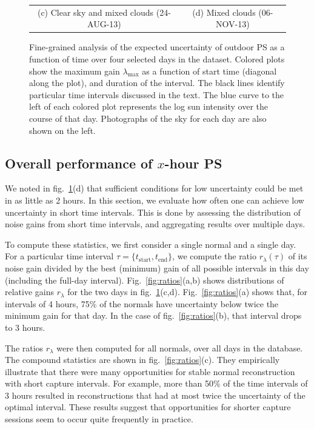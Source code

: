 \begin{figure}[!th]
\begin{tabular}{cc}
(c) Clear sky and mixed clouds (24-AUG-13) & (d) Mixed clouds (06-NOV-13)
\end{tabular}
\vspace{.25em}
\caption{Fine-grained analysis of the expected uncertainty of outdoor PS as a function of time over four selected days in the dataset. Colored plots show the maximum gain $\lambda_\text{max}$ as a function of start time (diagonal along the plot), and duration of the interval. The black lines identify particular time intervals discussed in the text. The blue curve to the left of each colored plot represents the log sun intensity over the course of that day. Photographs of the sky for each day are also shown on the left.}
\label{fig:events}
\end{figure}

\subsection{Overall performance of $x$-hour PS}  

We noted in fig.~\ref{fig:events}(d) that sufficient conditions for low uncertainty could be met in as little as 2 hours. In this section, we evaluate how often one can achieve low uncertainty in short time intervals. This is done by assessing the distribution of noise gains from short time intervals, and aggregating results over multiple days.

To compute these statistics, we first consider a single normal and a single day. For a particular time interval \mbox{$\tau = \{t_\text{start}, t_\text{end}\}$}, we compute the ratio $r_\lambda(\tau)$ of its noise gain divided by the best (minimum) gain of all possible intervals in this day (including the full-day interval). Fig.~\ref{fig:ratios}(a,b) shows distributions of relative gains $r_\lambda$ for the two days in fig.~\ref{fig:events}(c,d). Fig.~\ref{fig:ratios}(a) shows that, for intervals of 4 hours, 75\% of the normals have uncertainty below twice the minimum gain for that day. In the case of fig.~\ref{fig:ratios}(b), that interval drops to 3 hours. 

The ratios $r_\lambda$ were then computed for all normals, over all days in the database. The compound statistics are shown in fig.~\ref{fig:ratios}(c). They empirically illustrate that there were many opportunities for stable normal reconstruction with short capture intervals. For example, more than 50\% of the time intervals of 3 hours resulted in reconstructions that had at most twice the uncertainty of the optimal interval. These results suggest that opportunities for shorter capture sessions seem to occur quite frequently in practice.

